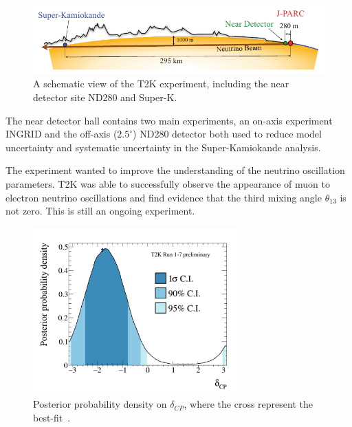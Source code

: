 \begin{figure}[h!]
\centering
  \centering
\includegraphics[width=\textwidth]{figures/T2KBeam.png}
\vspace{2mm}
\caption{A schematic view of the T2K experiment, including the near detector site ND280 and Super-K.}
\label{fig:T2K}
\end{figure}

The near detector hall contains two main experiments, an on-axis experiment INGRID and the off-axis ($2.5^\circ$) ND280 detector both used to reduce model uncertainty and systematic uncertainty in the Super-Kamiokande analysis. %

The experiment wanted to improve the understanding of the neutrino oscillation parameters. T2K was able to successfully observe the appearance of muon to electron neutrino oscillations and find evidence that the third mixing angle $\theta_{13}$ is not zero. This is still an ongoing experiment. 

\begin{figure}[h!]
\centering
  \centering
\includegraphics[width=0.7\textwidth]{figures/t2k1.jpeg}
\vspace{2mm}
\caption{Posterior probability density on $\delta_{CP}$, where the cross represent the best-fit~\cite{T2Kfigures}.}
\label{fig:T2KCP}
\end{figure}

